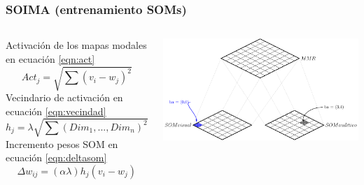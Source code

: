 \documentclass{beamer}
\begin{document}
\begin{frame}
\frametitle{SOIMA (entrenamiento SOMs)}
\begin{columns}
\begin{tiny}
Activación de los mapas modales en ecuación \ref{eqn:act}
  \begin{equation}\label{eqn:act}
    Act_{j}=\sqrt{\sum (v_{i}-w_{j})^{2}}
  \end{equation}
Vecindario de activación en ecuación \ref{eqn:vecindad}
   \begin{equation}\label{eqn:vecindad}
    h_{j}= \lambda  \sqrt{ \sum(Dim_{1},...,Dim_{n})^{2}}
  \end{equation}
Incremento pesos SOM en ecuación \ref{eqn:deltasom}
    \begin{equation}\label{eqn:deltasom}
    \Delta w_{ij}= (\alpha\lambda)h_{j}(v_{i}-w_{j})
  \end{equation}
\end{tiny}
\includegraphics[width=\textwidth]{images/soima1}
\end{columns}
\end{frame}
\end{document}

